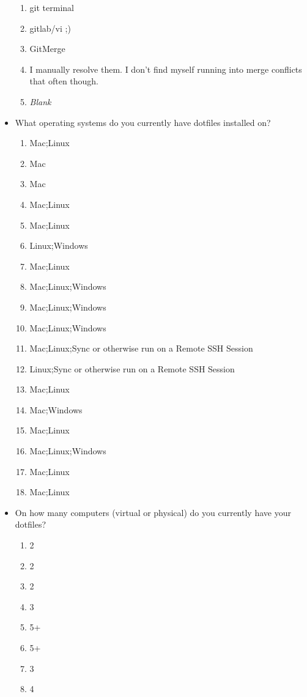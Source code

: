 \documentclass[letterpaper]{jdf}
\begin{document}
\begin{itemize}
\begin{enumerate}
        \item git terminal
        \item gitlab/vi ;)
        \item GitMerge
        \item I manually resolve them. I don't find myself running into merge conflicts that often though.
        \item \emph{Blank}
    \end{enumerate}
    \item What operating systems do you currently have dotfiles installed on?
    \begin{enumerate}
        \item Mac;Linux
        \item Mac
        \item Mac
        \item Mac;Linux
        \item Mac;Linux
        \item Linux;Windows
        \item Mac;Linux
        \item Mac;Linux;Windows
        \item Mac;Linux;Windows
        \item Mac;Linux;Windows
        \item Mac;Linux;Sync or otherwise run on a Remote SSH Session
        \item Linux;Sync or otherwise run on a Remote SSH Session
        \item Mac;Linux
        \item Mac;Windows
        \item Mac;Linux
        \item Mac;Linux;Windows
        \item Mac;Linux
        \item Mac;Linux
    \end{enumerate}
    \item On how many computers (virtual or physical) do you currently have your dotfiles?
    \begin{enumerate}
        \item 2
        \item 2
        \item 2
        \item 3
        \item 5+
        \item 5+
        \item 3
        \item 4

\end{enumerate}
\end{itemize}
\end{document}
